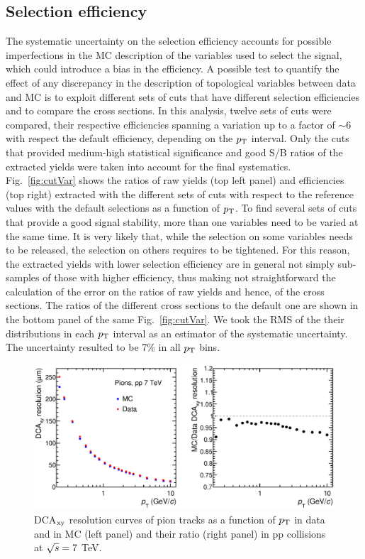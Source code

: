 \subsection{Selection efficiency}
\label{sec:CutVariation}
The systematic uncertainty on the selection efficiency accounts for 
possible imperfections in the MC description of the variables used to select the signal, 
which could introduce a bias in the efficiency. A possible test to quantify the effect of any discrepancy in the 
description of topological variables between data and MC is to exploit different sets of cuts
that have different selection efficiencies and to compare the cross sections.
In this analysis, twelve sets of cuts were compared, 
their respective efficiencies spanning a variation up to 
a factor of $\sim$6 with respect the default efficiency, depending on the $p_{\rm T}$ interval.
Only the cuts that provided 
medium-high statistical significance and good S/B ratios of the extracted yields
were taken into account for the final systematics.
Fig.~\ref{fig:cutVar} shows the ratios of raw yields (top left panel) and efficiencies (top right) 
extracted with the different sets of cuts with respect
to the reference values with the default selections as a function of $p_{\rm T}$.
To find several sets of cuts that provide a good signal stability, 
more than one variables need to be varied at the same time. It is very likely that,
while the selection on some variables needs to be released, the selection
on others requires to be tightened. For this reason, the extracted yields with lower selection efficiency are in general not simply
sub-samples of those with higher efficiency, thus making not straightforward the calculation
of the error on the ratios of raw yields and hence, of the cross sections.
The ratios of the different cross sections to the default one are shown in the bottom panel of the
same Fig.~\ref{fig:cutVar}. We took the RMS of the their distributions in each $p_{\rm T}$ interval as an estimator of 
the systematic uncertainty. The uncertainty resulted to be 7\% in all $p_{\rm T}$ bins.
\begin{figure}[!h]
\begin{center}
 \includegraphics[width=1\textwidth]{FigCap4/DCAxyReso_Pions.eps}
\caption{DCA$_{\rm xy}$ resolution curves of pion tracks as a function of $p_{\rm T}$ in data and in MC (left panel) and their ratio (right panel) in pp collisions at $\sqrt{s} = 7 $ TeV.}             
\label{fig:DCAxyReso}
\end{center}
\end{figure}
